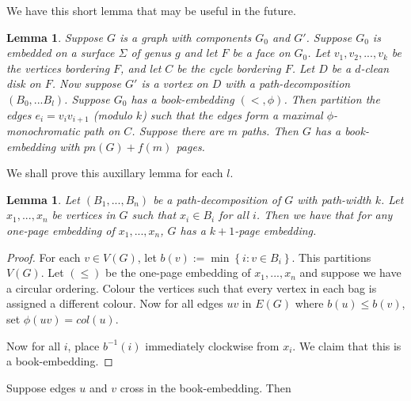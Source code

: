 \documentclass[]{article}
\newtheorem{lemma}[theorem]{Lemma}
\theoremstyle{definition}
\numberwithin{theorem}{section}
\numberwithin{equation}{section}
\begin{document}
We have this short lemma that may be useful in the future.
\begin{lemma}
	Suppose $G$ is a graph with components $G_0$ and $G'$. Suppose $G_0$ is embedded on a surface $\Sigma$ of genus $g$ and let $F$ be a face on $G_0$. Let $v_1, v_2, ..., v_k$ be the vertices bordering $F$, and let $C$ be the cycle bordering $F$. Let $D$ be a $d$-clean disk on $F$. Now suppose $G'$ is a vortex on $D$ with a path-decomposition $(B_0, ... B_l)$. Suppose $G_0$ has a book-embedding $(<, \phi)$. Then partition the edges $e_i = v_i v_{i + 1}$ (modulo $k$) such that the edges form a maximal $\phi$-monochromatic path on $C$. Suppose there are $m$ paths. Then $G$ has a book-embedding with $pn(G) + f(m)$ pages.
\end{lemma}
We shall prove this auxillary lemma for each $l$. 
\begin{lemma}
	Let $(B_1, ..., B_n)$ be a path-decomposition of $G$ with path-width $k$. Let $x_1, ..., x_n$ be vertices in $G$ such that $x_i \in B_i$ for all $i$. Then we have that for any one-page embedding of $x_1, ..., x_n$, $G$ has a $k + 1$-page embedding. 
\end{lemma}

\begin{proof}
	For each $v \in V(G)$, let $b(v) := \min \left\{ i : v \in B_i \right\}$. This partitions $V(G)$. Let $(\leq)$ be the one-page embedding of $x_1, ..., x_n$ and suppose we have a circular ordering. Colour the vertices such that every vertex in each bag is assigned a different colour. Now for all edges $uv$ in $E(G)$ where $b(u) \leq b(v) $, set $\phi(uv) = col(u)$. 
	
	Now for all $i$, place $b^{-1}(i)$ immediately clockwise from $x_i$. We claim that this is a book-embedding. 
\end{proof}
Suppose edges $u$ and $v$ cross in the book-embedding. Then 
\end{document}
